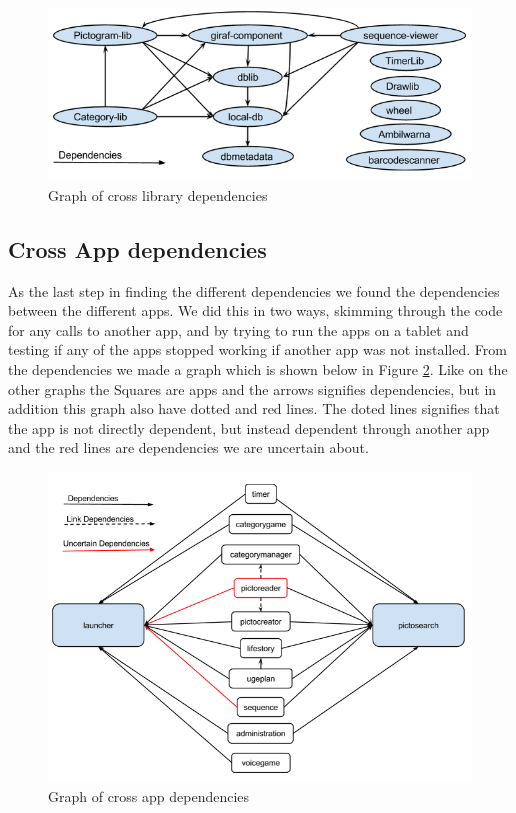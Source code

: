 \begin{figure}[H]
	\centering
	\includegraphics[width=0.8 \textwidth]{pictures/LibLibdependencies.png}
	\caption{Graph of cross library dependencies}
	\label{LibLibdependencies}
\end{figure}


\subsection{Cross App dependencies}
As the last step in finding the different dependencies we found the dependencies between the different apps. We did this in two ways, skimming through the code for any calls to another app, and by trying to run the apps on a tablet and testing if any of the apps  stopped working if another app was not installed. From the dependencies we made a graph which is shown below in Figure \ref{AppAppdependencies}. Like on the other graphs the Squares are apps and the arrows signifies dependencies, but in addition this graph also have dotted and red lines. The doted lines signifies that the app is not directly dependent, but instead dependent through another app and the red lines are dependencies we are uncertain about.

\begin{figure}[H]
	\centering
	\includegraphics[width=0.8 \textwidth]{pictures/AppAppdependencies.png}
	\caption{Graph of cross app dependencies}
	\label{AppAppdependencies}
\end{figure}